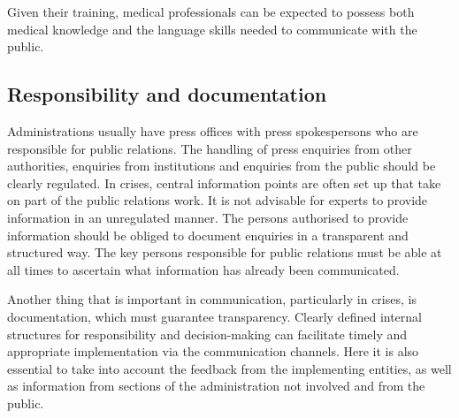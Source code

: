 \documentclass{article}
\begin{document}
Given their training, medical professionals can be expected to possess both medical knowledge and the language skills needed to communicate with the public.


\subsection{Responsibility and documentation}\label{H3455834}



Administrations usually have press offices with press spokespersons who are responsible for public relations. The handling of press enquiries from other authorities, enquiries from institutions and enquiries from the public should be clearly regulated. In crises, central information points are often set up that take on part of the public relations work. It is not advisable for experts to provide information in an unregulated manner. The persons authorised to provide information should be obliged to document enquiries in a transparent and structured way. The key persons responsible for public relations must be able at all times to ascertain what information has already been communicated.


Another thing that is important in communication, particularly in crises, is documentation, which must guarantee transparency. Clearly defined internal structures for responsibility and decision-making can facilitate timely and appropriate implementation via the communication channels. Here it is also essential to take into account the feedback from the implementing entities, as well as information from sections of the administration not involved and from the public.
\end{document}
